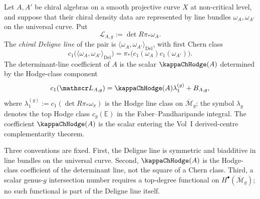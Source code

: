 \begin{definition}
\label{def:chiral-deligne-pairing}
Let \(A, A'\) be chiral algebras on a smooth projective curve \(X\)
at non-critical level, and suppose that their chiral density data are
represented by line bundles \(\omega_A,\omega_{A'}\) on the universal
curve. Put
\[
 \mathscr L_{A,g}:=\det R\pi_{*}\omega_{A}.
\]
The \emph{chiral Deligne line} of the pair is
\(\langle \omega_A,\omega_{A'}\rangle_{\mathrm{Del}}\), with
first Chern class
\[
 c_{1}\bigl(\langle \omega_A,\omega_{A'}\rangle_{\mathrm{Del}}\bigr)
 =
 \pi_{*}\bigl(c_{1}(\omega_A)c_{1}(\omega_{A'})\bigr).
\]
The determinant-line coefficient of \(A\) is the scalar
\(\kappaChHodge(A)\) determined by the Hodge-class component
\[
 c_{1}(\mathscr L_{A,g})
 =
 \kappaChHodge(A)\lambda_1^{(g)} + B_{A,g},
\]
where \(\lambda_1^{(g)}:=c_1(\det R\pi_*\omega_\pi)\) is the Hodge
line class on \(\overline{\mathcal M}_g\); the symbol \(\lambda_g\)
denotes the top Hodge class \(c_g(\mathbb E)\) in the
Faber--Pandharipande integral. The coefficient
\(\kappaChHodge(A)\) is the scalar entering the Vol~I
derived-centre complementarity theorem.
\end{definition}

Three conventions are fixed. First, the Deligne line is symmetric
and biadditive in line bundles on the universal curve. Second,
\(\kappaChHodge(A)\) is the Hodge-class coefficient of the
determinant line, not the square of a Chern class. Third, a scalar
genus-\(g\) intersection number requires a top-degree functional on
\(H^{\bullet}(\overline{\mathcal M}_{g})\); no such functional is
part of the Deligne line itself.

